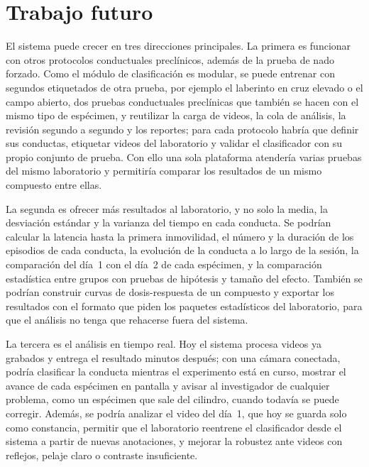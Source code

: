 \chapter*{Trabajo futuro}
\label{cap:trabajo_futuro}

El sistema puede crecer en tres direcciones principales. La primera es funcionar con otros
protocolos conductuales preclínicos, además de la prueba de nado forzado. Como el módulo de
clasificación es modular, se puede entrenar con segundos etiquetados de otra prueba, por
ejemplo el laberinto en cruz elevado o el campo abierto, dos pruebas conductuales preclínicas
que también se hacen con el mismo tipo de espécimen, y reutilizar la carga de
videos, la cola de análisis, la revisión segundo a segundo y los reportes; para cada protocolo
habría que definir sus conductas, etiquetar videos del laboratorio y validar el clasificador
con su propio conjunto de prueba. Con ello una sola plataforma atendería varias pruebas del
mismo laboratorio y permitiría comparar los resultados de un mismo compuesto entre ellas.

La segunda es ofrecer más resultados al laboratorio, y no solo la media, la desviación estándar
y la varianza del tiempo en cada conducta. Se podrían calcular la latencia hasta la primera
inmovilidad, el número y la duración de los episodios de cada conducta, la evolución de la
conducta a lo largo de la sesión, la comparación del día~1 con el día~2 de cada espécimen, y la
comparación estadística entre grupos con pruebas de hipótesis y tamaño del efecto. También se
podrían construir curvas de dosis-respuesta de un compuesto y exportar los resultados con el
formato que piden los paquetes estadísticos del laboratorio, para que el análisis no tenga que
rehacerse fuera del sistema.

La tercera es el análisis en tiempo real. Hoy el sistema procesa videos ya grabados y entrega el
resultado minutos después; con una cámara conectada, podría clasificar la conducta mientras el
experimento está en curso, mostrar el avance de cada espécimen en pantalla y avisar al
investigador de cualquier problema, como un espécimen que sale del cilindro, cuando todavía se
puede corregir. Además, se podría analizar el video del día~1, que hoy se guarda solo como
constancia, permitir que el laboratorio reentrene el clasificador desde el sistema a partir de
nuevas anotaciones, y mejorar la robustez ante videos con reflejos, pelaje claro o contraste
insuficiente.
